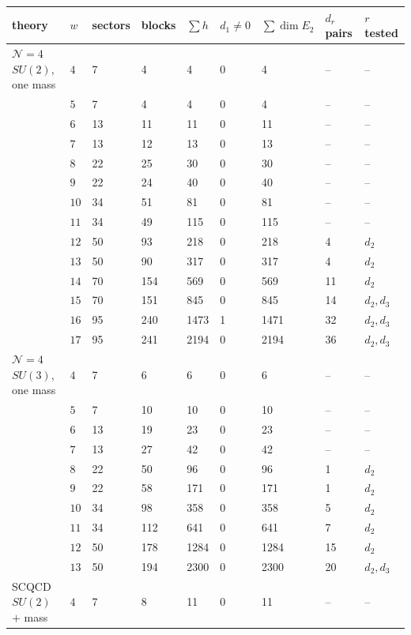 \documentclass[11pt]{article}
\numberwithin{equation}{section}
\numberwithin{figure}{section}
\numberwithin{table}{section}
\begin{document}
{\small\renewcommand{\arraystretch}{1.25}\setlength{\tabcolsep}{4pt}
\begin{xltabular}{\linewidth}{@{}>{\raggedright\arraybackslash}Xllllllll@{}}
\toprule
theory & $w$ & sectors & blocks & $\sum h$ & $d_1\ne0$ & $\sum\dim E_2$ & $d_r$ pairs & $r$ tested\\
\midrule\endhead
$\mathcal N{=}4$ $SU(2)$, one mass & $4$ & 7 & 4 & 4 & 0 & 4 & -- & --\\
 & $5$ & 7 & 4 & 4 & 0 & 4 & -- & --\\
 & $6$ & 13 & 11 & 11 & 0 & 11 & -- & --\\
 & $7$ & 13 & 12 & 13 & 0 & 13 & -- & --\\
 & $8$ & 22 & 25 & 30 & 0 & 30 & -- & --\\
 & $9$ & 22 & 24 & 40 & 0 & 40 & -- & --\\
 & $10$ & 34 & 51 & 81 & 0 & 81 & -- & --\\
 & $11$ & 34 & 49 & 115 & 0 & 115 & -- & --\\
 & $12$ & 50 & 93 & 218 & 0 & 218 & 4 & $d_2$\\
 & $13$ & 50 & 90 & 317 & 0 & 317 & 4 & $d_2$\\
 & $14$ & 70 & 154 & 569 & 0 & 569 & 11 & $d_2$\\
 & $15$ & 70 & 151 & 845 & 0 & 845 & 14 & $d_2,d_3$\\
 & $16$ & 95 & 240 & 1473 & 1 & 1471 & 32 & $d_2,d_3$\\
 & $17$ & 95 & 241 & 2194 & 0 & 2194 & 36 & $d_2,d_3$\\
$\mathcal N{=}4$ $SU(3)$, one mass & $4$ & 7 & 6 & 6 & 0 & 6 & -- & --\\
 & $5$ & 7 & 10 & 10 & 0 & 10 & -- & --\\
 & $6$ & 13 & 19 & 23 & 0 & 23 & -- & --\\
 & $7$ & 13 & 27 & 42 & 0 & 42 & -- & --\\
 & $8$ & 22 & 50 & 96 & 0 & 96 & 1 & $d_2$\\
 & $9$ & 22 & 58 & 171 & 0 & 171 & 1 & $d_2$\\
 & $10$ & 34 & 98 & 358 & 0 & 358 & 5 & $d_2$\\
 & $11$ & 34 & 112 & 641 & 0 & 641 & 7 & $d_2$\\
 & $12$ & 50 & 178 & 1284 & 0 & 1284 & 15 & $d_2$\\
 & $13$ & 50 & 194 & 2300 & 0 & 2300 & 20 & $d_2,d_3$\\
SCQCD $SU(2)$ $+$ mass & $4$ & 7 & 8 & 11 & 0 & 11 & -- & --\\

\end{xltabular}}
\end{document}
